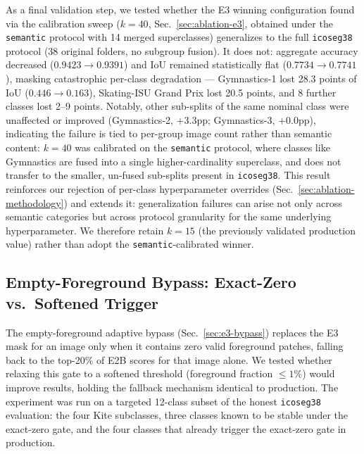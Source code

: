 As a final validation step, we tested whether the E3 winning configuration
found via the calibration sweep ($k{=}40$, Sec.~\ref{sec:ablation-e3}, obtained
under the \texttt{semantic} protocol with 14 merged superclasses) generalizes
to the full \texttt{icoseg38} protocol (38 original folders, no subgroup
fusion). It does not: aggregate accuracy decreased ($0.9423\to0.9391$) and
IoU remained statistically flat ($0.7734\to0.7741$), masking catastrophic
per-class degradation — Gymnastics-1 lost 28.3 points of IoU
($0.446\to0.163$), Skating-ISU Grand Prix lost 20.5 points, and 8 further
classes lost 2--9 points. Notably, other sub-splits of the same nominal
class were unaffected or improved (Gymnastics-2, $+3.3$pp; Gymnastics-3,
$+0.0$pp), indicating the failure is tied to per-group image count rather
than semantic content: $k{=}40$ was calibrated on the \texttt{semantic}
protocol, where classes like Gymnastics are fused into a single
higher-cardinality superclass, and does not transfer to the smaller,
un-fused sub-splits present in \texttt{icoseg38}. This result reinforces
our rejection of per-class hyperparameter overrides
(Sec.~\ref{sec:ablation-methodology}) and extends it: generalization
failures can arise not only across semantic categories but across protocol
granularity for the same underlying hyperparameter. We therefore retain
$k{=}15$ (the previously validated production value) rather than adopt the
\texttt{semantic}-calibrated winner.

\subsection{Empty-Foreground Bypass: Exact-Zero vs.\ Softened Trigger}
\label{sec:ablation-e3-bypass}

The empty-foreground adaptive bypass (Sec.~\ref{sec:e3-bypass}) replaces
the E3 mask for an image only when it contains zero valid foreground
patches, falling back to the top-20\% of E2B scores for that image alone.
We tested whether relaxing this gate to a softened threshold (foreground
fraction $\leq 1\%$) would improve results, holding the fallback mechanism
identical to production. The experiment was run on a targeted 12-class
subset of the honest \texttt{icoseg38} evaluation: the four Kite
subclasses, three classes known to be stable under the exact-zero gate,
and the four classes that already trigger the exact-zero gate in
production.

